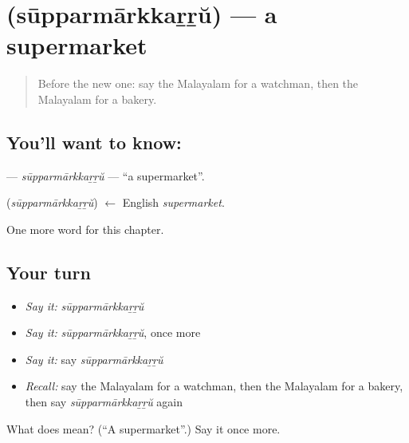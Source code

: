 \section[\texorpdfstring{\ml{സൂപ്പർമാർക്കറ്റ്} (sūpparmārkkaṟṟŭ)}{സൂപ്പർമാർക്കറ്റ് (sūpparmārkkaṟṟŭ)}]{ (sūpparmārkkaṟṟŭ) — a supermarket}

\label{lesson:ML-C263-supparmarkkarru}



\begin{quote}
Before the new one: say the Malayalam for a watchman, then the Malayalam for a bakery.
\end{quote}

\subsection*{You'll want to know: }
\textbf{} — \emph{sūpparmārkkaṟṟŭ} — \textquotedblleft{}a supermarket\textquotedblright{}.

\begin{cousinweb}
\textbf{} (\emph{sūpparmārkkaṟṟŭ}) $\leftarrow$ English \emph{supermarket}.
\end{cousinweb}

\begin{grammarlens}[title={What you've built}]
One more word for this chapter.
\end{grammarlens}

\subsection*{Your turn}
\begin{itemize}
\raggedright
  \item \emph{Say it:} \emph{sūpparmārkkaṟṟŭ}
  \item \emph{Say it:} \emph{sūpparmārkkaṟṟŭ}, once more
  \item \emph{Say it:} say \emph{sūpparmārkkaṟṟŭ}
  \item \emph{Recall:} say the Malayalam for a watchman, then the Malayalam for a bakery, then say \emph{sūpparmārkkaṟṟŭ} again
\end{itemize}

\begin{tcolorbox}[breakable,colback=teal!4,colframe=teal!35!black,title={Before you move on}]
What does  mean? (\textquotedblleft{}A supermarket\textquotedblright{}.) Say it once more.
\end{tcolorbox}
